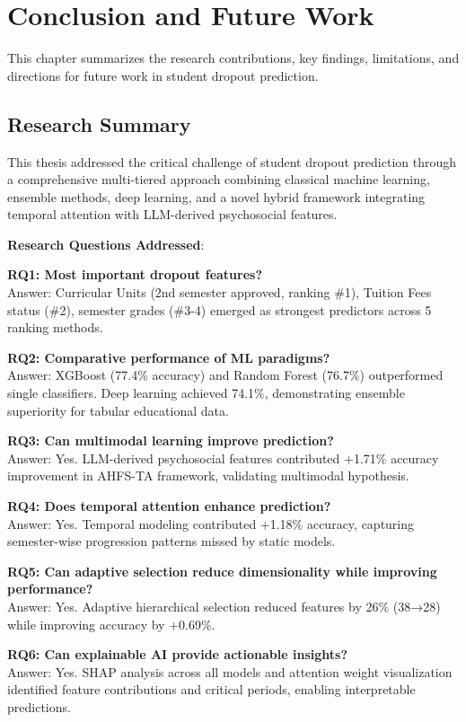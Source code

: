 \chapter{Conclusion and Future Work}

This chapter summarizes the research contributions, key findings, limitations, and directions for future work in student dropout prediction.

\section{Research Summary}

This thesis addressed the critical challenge of student dropout prediction through a comprehensive multi-tiered approach combining classical machine learning, ensemble methods, deep learning, and a novel hybrid framework integrating temporal attention with LLM-derived psychosocial features.

\textbf{Research Questions Addressed}:

\textbf{RQ1: Most important dropout features?}
\\Answer: Curricular Units (2nd semester approved, ranking \#1), Tuition Fees status (\#2), semester grades (\#3-4) emerged as strongest predictors across 5 ranking methods.

\textbf{RQ2: Comparative performance of ML paradigms?}
\\Answer: XGBoost (77.4\% accuracy) and Random Forest (76.7\%) outperformed single classifiers. Deep learning achieved 74.1\%, demonstrating ensemble superiority for tabular educational data.

\textbf{RQ3: Can multimodal learning improve prediction?}
\\Answer: Yes. LLM-derived psychosocial features contributed +1.71\% accuracy improvement in AHFS-TA framework, validating multimodal hypothesis.

\textbf{RQ4: Does temporal attention enhance prediction?}
\\Answer: Yes. Temporal modeling contributed +1.18\% accuracy, capturing semester-wise progression patterns missed by static models.

\textbf{RQ5: Can adaptive selection reduce dimensionality while improving performance?}
\\Answer: Yes. Adaptive hierarchical selection reduced features by 26\% (38→28) while improving accuracy by +0.69\%.

\textbf{RQ6: Can explainable AI provide actionable insights?}
\\Answer: Yes. SHAP analysis across all models and attention weight visualization identified feature contributions and critical periods, enabling interpretable predictions.

